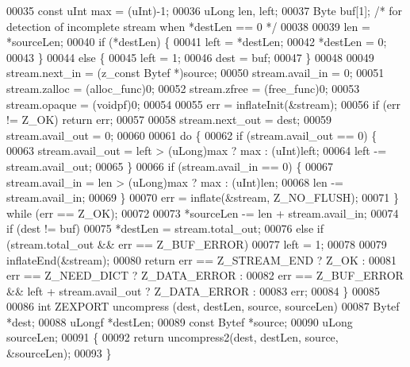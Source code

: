 \begin{DoxyCode}
00035     \textcolor{keyword}{const} uInt max = (uInt)-1;
00036     uLong len, left;
00037     Byte buf[1];    \textcolor{comment}{/* for detection of incomplete stream when *destLen == 0 */}
00038 
00039     len = *sourceLen;
00040     \textcolor{keywordflow}{if} (*destLen) \{
00041         left = *destLen;
00042         *destLen = 0;
00043     \}
00044     \textcolor{keywordflow}{else} \{
00045         left = 1;
00046         dest = buf;
00047     \}
00048 
00049     stream.next\_in = (z\_const Bytef *)source;
00050     stream.avail\_in = 0;
00051     stream.zalloc = (alloc\_func)0;
00052     stream.zfree = (free\_func)0;
00053     stream.opaque = (voidpf)0;
00054 
00055     err = inflateInit(&stream);
00056     \textcolor{keywordflow}{if} (err != Z\_OK) \textcolor{keywordflow}{return} err;
00057 
00058     stream.next\_out = dest;
00059     stream.avail\_out = 0;
00060 
00061     \textcolor{keywordflow}{do} \{
00062         \textcolor{keywordflow}{if} (stream.avail\_out == 0) \{
00063             stream.avail\_out = left > (uLong)max ? max : (uInt)left;
00064             left -= stream.avail\_out;
00065         \}
00066         \textcolor{keywordflow}{if} (stream.avail\_in == 0) \{
00067             stream.avail\_in = len > (uLong)max ? max : (uInt)len;
00068             len -= stream.avail\_in;
00069         \}
00070         err = inflate(&stream, Z\_NO\_FLUSH);
00071     \} \textcolor{keywordflow}{while} (err == Z\_OK);
00072 
00073     *sourceLen -= len + stream.avail\_in;
00074     \textcolor{keywordflow}{if} (dest != buf)
00075         *destLen = stream.total\_out;
00076     \textcolor{keywordflow}{else} \textcolor{keywordflow}{if} (stream.total\_out && err == Z\_BUF\_ERROR)
00077         left = 1;
00078 
00079     inflateEnd(&stream);
00080     \textcolor{keywordflow}{return} err == Z\_STREAM\_END ? Z\_OK :
00081            err == Z\_NEED\_DICT ? Z\_DATA\_ERROR  :
00082            err == Z\_BUF\_ERROR && left + stream.avail\_out ? Z\_DATA\_ERROR :
00083            err;
00084 \}
00085 
00086 \textcolor{keywordtype}{int} ZEXPORT uncompress (dest, destLen, source, sourceLen)
00087     Bytef *dest;
00088     uLongf *destLen;
00089     \textcolor{keyword}{const} Bytef *source;
00090     uLong sourceLen;
00091 \{
00092     \textcolor{keywordflow}{return} uncompress2(dest, destLen, source, &sourceLen);
00093 \}
\end{DoxyCode}
